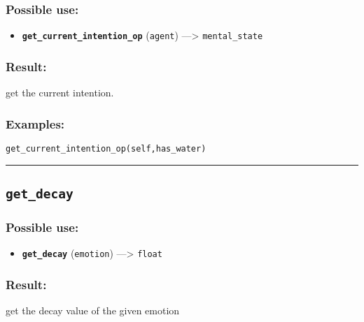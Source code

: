 \documentclass[]{book}
\providecommand{\tightlist}{%
  \setlength{\itemsep}{0pt}\setlength{\parskip}{0pt}}
\theoremstyle{definition}
\theoremstyle{definition}
\theoremstyle{definition}
\theoremstyle{remark}
\begin{document}
\subsubsection{Possible use:}\label{possible-use-201}

\begin{itemize}
\tightlist
\item
  \textbf{\texttt{get\_current\_intention\_op}} (\texttt{agent})
  ---\textgreater{} \texttt{mental\_state}
\end{itemize}

\subsubsection{Result:}\label{result-195}

get the current intention.

\subsubsection{Examples:}\label{examples-148}

\begin{verbatim}
get_current_intention_op(self,has_water) 
\end{verbatim}

\begin{center}\rule{0.5\linewidth}{\linethickness}\end{center}

\subsection{\texorpdfstring{\texttt{get\_decay}}{get\_decay}}\label{get_decay}

\subsubsection{Possible use:}\label{possible-use-202}

\begin{itemize}
\tightlist
\item
  \textbf{\texttt{get\_decay}} (\texttt{emotion}) ---\textgreater{}
  \texttt{float}
\end{itemize}

\subsubsection{Result:}\label{result-196}

get the decay value of the given emotion
\end{document}
